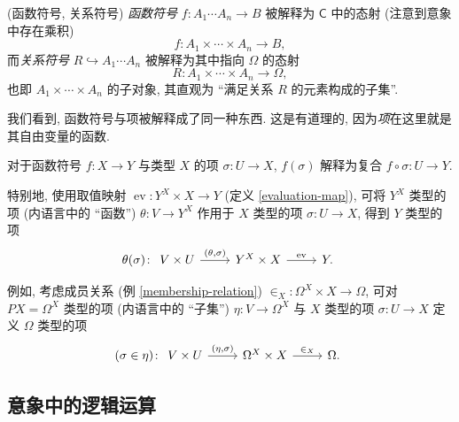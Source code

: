 \begin{definition}
	{(函数符号, 关系符号)}
	\emph{函数符号} $f\colon A_1\cdots A_n \to B$ 被解释为 $\mathsf C$ 中的态射 (注意到意象中存在乘积)
	$$f\colon A_1\times\cdots\times A_n\to B,$$
	而\emph{关系符号} $R\hookrightarrow A_1\cdots A_n$ 被解释为其中指向 $\Omega$ 的态射
	$$
	R\colon A_1\times\cdots\times A_n \to \Omega,
	$$
	也即 $A_1\times\cdots\times A_n$ 的子对象, 其直观为 ``满足关系 $R$ 的元素构成的子集''.
	
	我们看到, 函数符号与项被解释成了同一种东西. 这是有道理的, 因为\emph{项}在这里就是其自由变量的函数.
	
	对于函数符号 $f\colon X \to Y$ 与类型 $X$ 的项 $\sigma\colon U \to X$, $f(\sigma)$ 解释为复合 $f\circ\sigma \colon U \to Y$.
\end{definition}

特别地, 使用取值映射 $\operatorname{ev}\colon Y^X\times X\to Y$ (定义 \ref{evaluation-map}),
可将 $Y^X$ 类型的项 (内语言中的 ``函数'') $\theta\colon V\to Y^X$
作用于 $X$ 类型的项 $\sigma \colon U \to X$,
得到 $Y$ 类型的项
\[\theta(\sigma)\colon
\begin{tikzcd}[ampersand replacement=\&]
	{V\times U} \& {Y^X\times X} \& Y.
	\arrow["{(\theta,\sigma)}", from=1-1, to=1-2]
	\arrow["{\operatorname{ev}}", from=1-2, to=1-3]
\end{tikzcd}\]

例如, 考虑成员关系 (例 \ref{membership-relation}) ${\in_X} \colon \Omega^X\times X \to \Omega$,
可对 $PX=\Omega^X$ 类型的项 (内语言中的 ``子集'') $\eta\colon V \to \Omega^X$ 与 $X$ 类型的项 $\sigma\colon U\to X$ 定义 $\Omega$ 类型的项
\[
(\sigma \in \eta) \colon 
\begin{tikzcd}[ampersand replacement=\&]
	{V\times U} \& {\Omega^X\times X} \& \Omega.
	\arrow["{(\eta,\sigma)}", from=1-1, to=1-2]
	\arrow["{\in_X}", from=1-2, to=1-3]
\end{tikzcd}\]



\subsection{意象中的逻辑运算}

